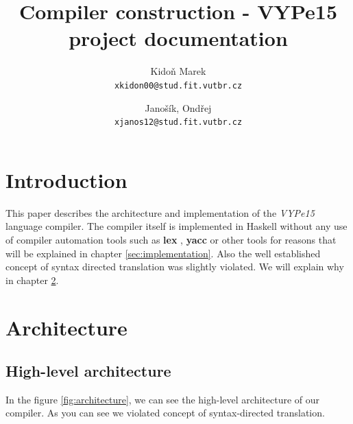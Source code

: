 \documentclass[titlepage]{article}
\title{Compiler construction - VYPe15 project documentation}
\author{
	Kidoň Marek\\
	\texttt{xkidon00@stud.fit.vutbr.cz}
\and 
	Janošík, Ondřej\\
	\texttt{xjanos12@stud.fit.vutbr.cz}
}
\date{}
\begin{document}
\maketitle

\section{Introduction}
This paper describes the architecture and implementation of the \textit{VYPe15} language
compiler. The compiler itself is implemented in Haskell without any use of compiler 
automation
tools such as \textbf{lex} \cite{lex}, \textbf{yacc} \cite{yacc} or 
other tools for reasons that will be explained in chapter 
\ref{sec:implementation}. Also the well established concept of 
syntax directed translation was slightly violated.
We will explain why in chapter \ref{sec:architecture}.

\section{Architecture}
\label{sec:architecture}

\subsection{High-level architecture}
In the figure \ref{fig:architecture}, we can see the high-level architecture of our
compiler. As you can see we violated concept of syntax-directed translation.
\end{document}
